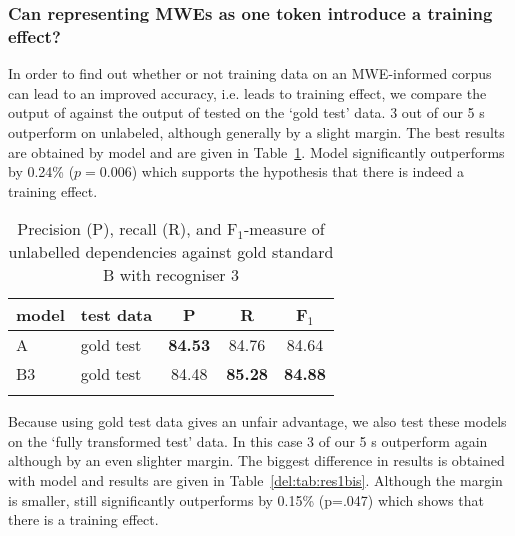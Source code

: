 \documentclass[output=paper]{langsci/langscibook}
\begin{document}
\subsubsection{Can representing MWEs as one token introduce a training effect?}

\indent In order to find out whether or not training data on an MWE-informed corpus can lead to an improved accuracy, i.e. leads to training effect, we compare the output of {\modelB} against the output of {\modelA} tested on the `gold test' data. 3 out of our 5 {\modelB} s outperform {\modelA} on unlabeled, although generally by a slight margin. The best results are obtained by model and are given in Table~\ref{del:tab:res1}. Model significantly outperforms {\modelA} by 0.24\% ($p=0.006$) which supports the hypothesis that there is indeed a training effect.

\begin{table}[h]
    \centering
    \begin{tabular}{l l c c c} %
      \lsptoprule
        \textnormal{model}
        & \textnormal{test data}
        & \textnormal{P}
        & \textnormal{R}
        & \textnormal{F$_1$}
        \\ %
        \midrule
        A & gold test &\textbf{84.53}  &84.76 &84.64 \\
        B3 & gold test &84.48  &\textbf{85.28}  &\textbf{84.88} \tabularnewline %
        \lspbottomrule
    \end{tabular}
    \caption{Precision (P), recall (R), and F$_1$-measure of unlabelled dependencies against gold standard B with recogniser 3 \label{del:tab:res1}}
\end{table}

\indent Because using gold test data gives {\modelB} an unfair advantage, we also test these models on the `fully transformed test' data. In this case 3 of our 5 {\modelB} s outperform {\modelA} again although by an even slighter margin. The biggest difference in results is obtained with model and results are given in Table~\ref{del:tab:res1bis}. Although the margin is smaller, {\modelB} still significantly outperforms {\modelA} by 0.15\% (p=.047) which shows that there is a training effect.
\end{document}
